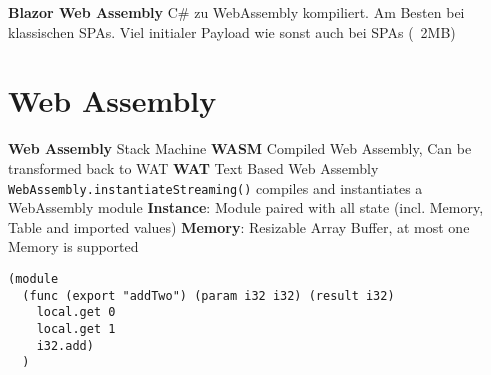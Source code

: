 \begin{multicols*}{2}
\textbf{Blazor Web Assembly} C\# zu WebAssembly kompiliert. Am Besten bei klassischen SPAs. Viel initialer Payload wie sonst auch bei SPAs (~2MB)

\section{Web Assembly}
\textbf{Web Assembly} Stack Machine
\textbf{WASM} Compiled Web Assembly, Can be transformed back to WAT
\textbf{WAT} Text Based Web Assembly \lstinline|WebAssembly.instantiateStreaming()| compiles and instantiates a WebAssembly module
\textbf{Instance}: Module paired with all state (incl. Memory, Table and imported values)
\textbf{Memory}: Resizable Array Buffer, at most one Memory is supported
\begin{verbatim}
(module
  (func (export "addTwo") (param i32 i32) (result i32)
    local.get 0
    local.get 1
    i32.add)
  )
\end{verbatim}


\end{multicols*}
